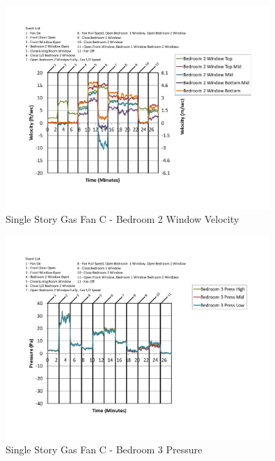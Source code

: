 \documentclass{article}
\begin{document}
\begin{appendices}
	\begin{figure}[H]
		\centering
		\includegraphics[height=3.05in,trim=0.67in 1.1in 0.67in 0.8in,clip=true]{0_Images/Results_Charts/ColdFlow/Single_Story/Gas/C/Bedroom_2_Window_Velocity.pdf}
		\caption{Single Story Gas Fan C - Bedroom 2 Window Velocity}
	\end{figure}
 

	\begin{figure}[H]
		\centering
		\includegraphics[height=3.05in,trim=0.67in 1.1in 0.67in 0.8in,clip=true]{0_Images/Results_Charts/ColdFlow/Single_Story/Gas/C/Bedroom_3_Pressure.pdf}
		\caption{Single Story Gas Fan C - Bedroom 3 Pressure}
	\end{figure}
 
	\clearpage


\end{appendices}
\end{document}

